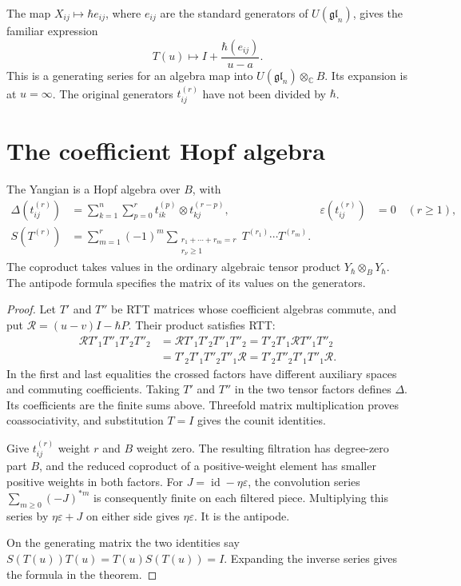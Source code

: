 The map $X_{ij}\mapsto\hbar e_{ij}$, where $e_{ij}$ are the standard
generators of $U(\mathfrak{gl}_n)$, gives the familiar expression
\[
 T(u)\longmapsto I+\frac{\hbar(e_{ij})}{u-a}.
\]
This is a generating series for an algebra map into
$U(\mathfrak{gl}_n)\otimes_{\mathbb C}B$.  Its expansion is at $u=\infty$.
The original generators $t_{ij}^{(r)}$ have not been divided by $\hbar$.

\section{The coefficient Hopf algebra}

\begin{theorem}\label{cbc:rtt:hopf}
The Yangian is a Hopf algebra over $B$, with
\begin{align*}
 \Delta(t_{ij}^{(r)})
 &=\sum_{k=1}^n\sum_{p=0}^r
       t_{ik}^{(p)}\otimes t_{kj}^{(r-p)},&
 \varepsilon(t_{ij}^{(r)})&=0\quad(r\geq1),\\
 S(T^{(r)})
 &=\sum_{m=1}^r(-1)^m
   \sum_{\substack{r_1+\cdots+r_m=r\\r_\nu\geq1}}
       T^{(r_1)}\cdots T^{(r_m)}.
\end{align*}
The coproduct takes values in the ordinary algebraic tensor product
$Y_\hbar\otimes_B Y_\hbar$.  The antipode formula specifies the matrix
of its values on the generators.
\end{theorem}
\begin{proof}
Let $T'$ and $T''$ be RTT matrices whose coefficient algebras commute,
and put $\mathcal R=(u-v)I-\hbar P$.  Their product satisfies RTT:
\begin{align*}
 \mathcal R T'_1T''_1T'_2T''_2
 &=\mathcal R T'_1T'_2T''_1T''_2
  =T'_2T'_1\mathcal R T''_1T''_2\\
 &=T'_2T'_1T''_2T''_1\mathcal R
  =T'_2T''_2T'_1T''_1\mathcal R.
\end{align*}
In the first and last equalities the crossed factors have different
auxiliary spaces and commuting coefficients.  Taking $T'$ and $T''$
in the two tensor factors defines $\Delta$.  Its coefficients are the
finite sums above.  Threefold matrix multiplication proves
coassociativity, and substitution $T=I$ gives the counit identities.

Give $t_{ij}^{(r)}$ weight $r$ and $B$ weight zero.  The resulting
filtration has degree-zero part $B$, and the reduced coproduct of a
positive-weight element has smaller positive weights in both factors.
For $J=\operatorname{id}-\eta\varepsilon$, the convolution series
$\sum_{m\geq0}(-J)^{*m}$ is consequently finite on each filtered piece.
Multiplying this series by $\eta\varepsilon+J$ on either side gives
$\eta\varepsilon$.  It is the antipode.

On the generating matrix the
two identities say $S(T(u))T(u)=T(u)S(T(u))=I$.
Expanding the inverse series gives the formula in the theorem.
\end{proof}

